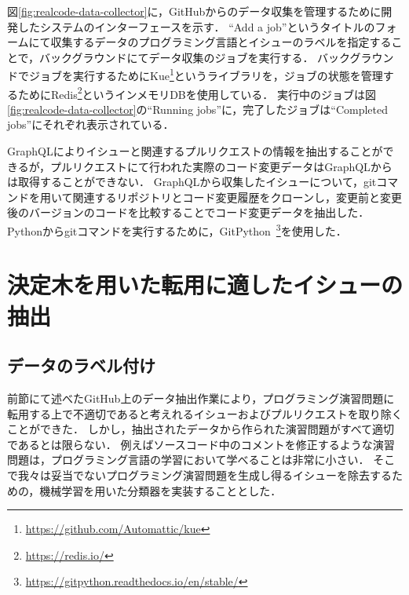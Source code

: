 図\ref{fig:realcode-data-collector}に，GitHubからのデータ収集を管理するために開発したシステムのインターフェースを示す．
``Add a job''というタイトルのフォームにて収集するデータのプログラミング言語とイシューのラベルを指定することで，バックグラウンドにてデータ収集のジョブを実行する．
バックグラウンドでジョブを実行するためにKue\footnote{\url{https://github.com/Automattic/kue}}というライブラリを，ジョブの状態を管理するためにRedis\footnote{\url{https://redis.io/}}というインメモリDBを使用している．
実行中のジョブは図\ref{fig:realcode-data-collector}の``Running jobs''に，完了したジョブは``Completed jobs''にそれぞれ表示されている．

GraphQLによりイシューと関連するプルリクエストの情報を抽出することができるが，プルリクエストにて行われた実際のコード変更データはGraphQLからは取得することができない．
GraphQLから収集したイシューについて，gitコマンドを用いて関連するリポジトリとコード変更履歴をクローンし，変更前と変更後のバージョンのコードを比較することでコード変更データを抽出した．
Pythonからgitコマンドを実行するために，GitPython~\footnote{\url{https://gitpython.readthedocs.io/en/stable/}}を使用した．

  
\section{決定木を用いた転用に適したイシューの抽出}

\subsection{データのラベル付け}
前節にて述べたGitHub上のデータ抽出作業により，プログラミング演習問題に転用する上で不適切であると考えれるイシューおよびプルリクエストを取り除くことができた．
しかし，抽出されたデータから作られた演習問題がすべて適切であるとは限らない．
例えばソースコード中のコメントを修正するような演習問題は，プログラミング言語の学習において学べることは非常に小さい．
そこで我々は妥当でないプログラミング演習問題を生成し得るイシューを除去するための，機械学習を用いた分類器を実装することとした．


